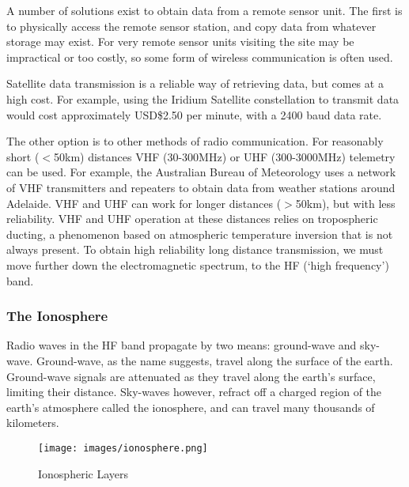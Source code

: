 \documentclass[a4paper,12pt]{article}
\begin{document}
A number of solutions exist to obtain data from a remote sensor unit. The first is to physically access the remote sensor station, and copy data from whatever storage may exist. For very remote sensor units visiting the site may be impractical or too costly, so some form of wireless communication is often used. 

Satellite data transmission is a reliable way of retrieving data, but comes at a high cost. For example, using the Iridium Satellite constellation to transmit data would cost approximately USD\$2.50 per minute, with a 2400 baud data rate\citep{ref:iridium}.

The other option is to other methods of radio communication. For reasonably short ($<$50km) distances VHF (30-300MHz) or UHF (300-3000MHz) telemetry can be used. For example, the Australian Bureau of Meteorology uses a network of VHF transmitters\citep{ref:bomtx} and repeaters to obtain data from weather stations around Adelaide. VHF and UHF can work for longer distances ($>$50km), but with less reliability. VHF and UHF operation at these distances relies on tropospheric ducting, a phenomenon based on atmospheric temperature inversion that is not always present. To obtain high reliability long distance transmission, we must move further down the electromagnetic spectrum, to the HF (`high frequency') band.

\subsubsection*{The Ionosphere}

Radio waves in the HF band propagate by two means: ground-wave and sky-wave. Ground-wave, as the name suggests, travel along the surface of the earth. Ground-wave signals are attenuated as they travel along the earth's surface, limiting their distance. Sky-waves however, refract off a charged region of the earth's atmosphere called the ionosphere, and can travel many thousands of kilometers.

\begin{figure}[h]
  \begin{center}
    \texttt{[image: images/ionosphere.png]}
  \end{center}
  \caption{Ionospheric Layers}
  \label{fig:ionosphere}
\end{figure}
\end{document}
